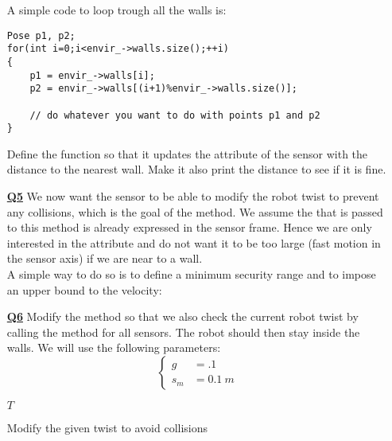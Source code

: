\documentclass{ecnreport}
\begin{document}
\begin{itemize}
A simple code to loop trough all the walls is:
\begin{center}\cppstyle
\begin{lstlisting}
Pose p1, p2;
for(int i=0;i<envir_->walls.size();++i)
{
    p1 = envir_->walls[i];
    p2 = envir_->walls[(i+1)%envir_->walls.size()];

    // do whatever you want to do with points p1 and p2
}
\end{lstlisting}
\end{center}

Define the  function so that it updates the attribute  of the sensor with the distance to the nearest wall. Make it also print the distance to see if it is fine.

\medskip\item[\textbf{\underline{Q5}}] We now want the sensor to be able to modify the robot twist to prevent any collisions, which is the goal of the  method.
We assume the  that is passed to this method is already expressed in the sensor frame. Hence we are only interested in the  attribute and do not want it to be too large (fast motion in the sensor axis) if we are near to a wall.\\
A simple way to do so is to define a minimum security range and to impose an upper bound to the velocity:

\medskip\item[\textbf{\underline{Q6}}] Modify the  method so that we also check the current robot twist by calling the  method for all sensors. The robot should then stay inside the walls. We will use the following parameters:
\begin{equation*}
\left\{\begin{array}{ll}
g &= .1 \\
s_m &= 0.1~ m
\end{array}\right.
\end{equation*}

\begin{algorithm}[!h]
{}
\Return $T$
\caption{Modify the given twist to avoid collisions}
\label{algo:range}
\end{algorithm}
\end{itemize}
\end{document}
